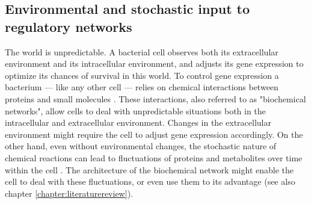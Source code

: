 
\subsection*{Environmental and stochastic input to regulatory networks}

The world is unpredictable.
%
A bacterial cell observes both its extracellular environment and its intracellular environment,
and adjusts its gene expression to 
optimize its chances of survival in this world.
%
To control gene expression a bacterium --- like any other cell --- relies on chemical interactions between proteins and small molecules \cite{Bray1995, Alon2006, Alon2007, Tyson2010}.
These interactions, also referred to as "biochemical networks", 
%
allow cells to deal with 
unpredictable situations
both in the intracellular and extracellular environment.
%
Changes in the extracellular environment might require the cell to adjust gene expression accordingly.
%
On the other hand,  even without environmental changes, the stochastic nature of chemical reactions can lead to fluctuations of proteins and metabolites over time within the cell \cite{Elowitz2002,Kiviet2014}.
The architecture of the biochemical network might enable the cell to deal with these fluctuations, or even use them to its advantage (see also chapter \ref{chapter:literaturereview}).
%
